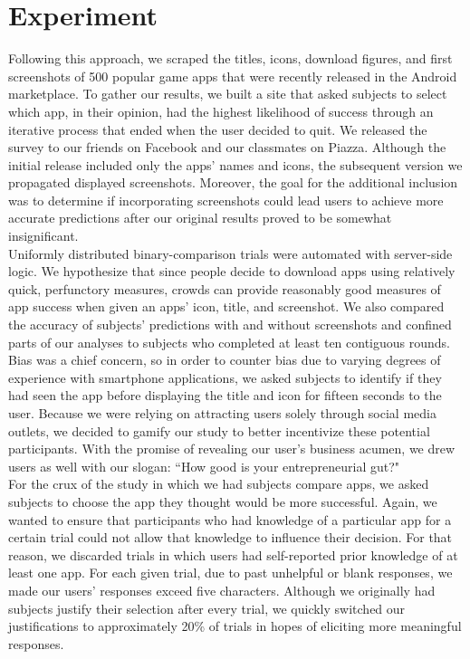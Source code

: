 \section{Experiment}


Following this approach, we scraped the titles, icons, download figures, and first screenshots of 500 popular game apps that were recently released in the Android marketplace.  To gather our results, we built a site that asked subjects to select which app, in their opinion, had the highest likelihood of success through an iterative process that ended when the user decided to quit.  We released the survey to our friends on Facebook and our classmates on Piazza. Although the initial release included only the apps' names and icons, the subsequent version we propagated displayed screenshots. Moreover, the goal for the additional inclusion was to determine if incorporating screenshots could lead users to achieve more accurate predictions after our original results proved to be somewhat insignificant.  \\

Uniformly distributed binary-comparison trials were automated with server-side logic. We hypothesize that since people decide to download apps using relatively quick, perfunctory measures, crowds can provide reasonably good measures of app success when given an apps' icon, title, and screenshot. We also compared the accuracy of subjects' predictions with and without screenshots and confined parts of our analyses to subjects who completed at least ten contiguous rounds. Bias was a chief concern, so in order to counter bias due to varying degrees of experience with smartphone applications, we asked subjects to identify if they had seen the app before displaying the title and icon for fifteen seconds to the user. Because we were relying on attracting users solely through social media outlets, we decided to gamify our study to better incentivize these potential participants. With the promise of revealing our user's business acumen, we drew users as well with our slogan: “How good is your entrepreneurial gut?"\\

For the crux of the study in which we had subjects compare apps, we asked subjects to choose the app they thought would be more successful.  Again, we wanted to ensure that participants who had knowledge of a particular app for a certain trial could not allow that knowledge to influence their decision. For that reason, we discarded trials in which users had self-reported prior knowledge of at least one app. For each given trial, due to past unhelpful or blank responses, we made our users' responses exceed five characters. Although we originally had subjects justify their selection after every trial, we quickly switched our justifications to approximately 20\% of trials in hopes of eliciting more meaningful responses.\\
